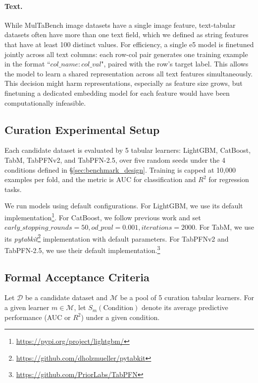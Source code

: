 \paragraph{Text.} While MulTaBench image datasets have a single image feature, text-tabular datasets often have more than one text field, which we defined as string features that have at least 100 distinct values. For efficiency, a single e5 model is finetuned jointly across all text columns: each row-col pair generates one training example in the format ``$col\_name: col\_val$", paired with the row's target label. This allows the model to learn a shared representation across all text features simultaneously. This decision might harm representations, especially as feature size grows, but finetuning a dedicated embedding model for each feature would have been computationally infeasible.


\subsection{Curation Experimental Setup}

Each candidate dataset is evaluated by 5 tabular learners: LightGBM, CatBoost, TabM, TabPFNv2, and TabPFN-2.5, over five random seeds under the 4 conditions defined in \S\ref{sec:benchmark_design}. Training is capped at 10,000 examples per fold, and the metric is AUC for classification and $R^2$ for regression tasks.

We run models using default configurations. For LightGBM, we use its default implementation\footnote{\url{https://pypi.org/project/lightgbm/}}. For CatBoost, we follow previous work \cite{gorishniy_revisiting_2021, arazi_tabstar_2025} and set $early\_stopping\_rounds = 50, od\_pval = 0.001, iterations = 2000$. For TabM, we use its \textit{pytabkit}\footnote{\url{https://github.com/dholzmueller/pytabkit}} implementation with default parameters. For TabPFNv2 and TabPFN-2.5, we use their default implementation.\footnote{\url{https://github.com/PriorLabs/TabPFN}}


\subsection{Formal Acceptance Criteria}
\label{app:curation_formal}


Let $\mathcal{D}$ be a candidate dataset and $\mathcal{M}$ be a pool of 5 curation tabular learners. For a given learner $m \in \mathcal{M}$, let $S_m(\text{Condition})$ denote its average predictive performance (AUC or $R^2$) under a given condition.

